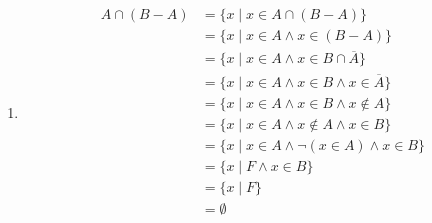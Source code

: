 \documentclass[12pt letter]{report}
\begin{document}
{{\begin{enumerate}
\begin{align*}
            \end{align*}
      \item
            \begin{align*}
              A \cap  \left( B - A \right) & = \{x  \mid x \in A \cap \left( B - A \right) \} \tag*{Set Builder Notation}                               \\
                                           & = \{x  \mid x \in A \wedge  x \in \left( B - A \right) \} \tag*{By Definition of Intersection}             \\
                                           & = \{x  \mid x \in A \wedge x \in B \cap  \overline{A}\} \tag*{By Definition of Difference}                 \\
                                           & = \{x  \mid x \in A \wedge x \in B \wedge x \in \overline{A}\} \tag*{By Definition of Intersection}        \\
                                           & = \{x  \mid x \in A \wedge x \in B \wedge x \notin A\} \tag*{By Definition of Complement}                  \\
                                           & = \{x  \mid x \in A \wedge x \notin A \wedge  x \in B\} \tag*{By Second Commutative Law for propositional
              logic}                                                                                                                                    \\
                                           & = \{x  \mid x \in A \wedge \neg \left( x \in A \right) \wedge  x \in B \} \tag*{By Definition of $\notin$} \\
                                           & = \{x  \mid F \wedge  x \in B\} \tag*{By Second Negation Law for
              propositional logic}                                                                                                                      \\
                                           & = \{x  \mid F\} \tag*{By Second Domination Law for propositional logic}                                    \\
                                           & = \emptyset \tag*{By Definition of Empty set}                                                              \\
            \end{align*}
    \end{enumerate}
  }
}
\end{document}
